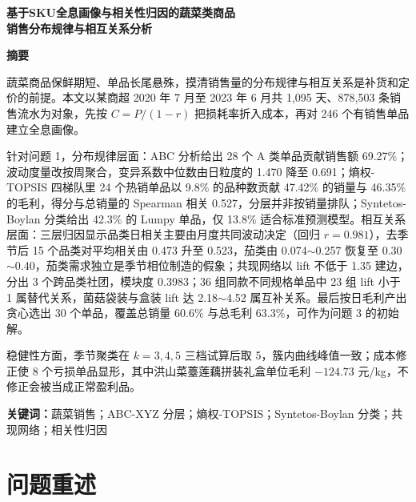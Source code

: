 \documentclass[zihao=-4,a4paper]{ctexart}
\begin{document}
\begin{center}
{\textbf{基于SKU全息画像与相关性归因的蔬菜类商品\\销售分布规律与相互关系分析}}
\end{center}

\vspace{0.8em}
\begin{center}\textbf{摘\quad 要}\end{center}

蔬菜商品保鲜期短、单品长尾悬殊，摸清销售量的分布规律与相互关系是补货和定价的前提。本文以某商超 2020 年 7 月至 2023 年 6 月共 1,095 天、878,503 条销售流水为对象，先按 $C=P/(1-r)$ 把损耗率折入成本，再对 246 个有销售单品建立全息画像。

针对问题 1，分布规律层面：ABC 分析给出 28 个 A 类单品贡献销售额 69.27\%；波动度量改按周聚合，变异系数中位数由日粒度的 1.470 降至 0.691；熵权-TOPSIS 四梯队里 24 个热销单品以 9.8\% 的品种数贡献 47.42\% 的销量与 46.35\% 的毛利，得分与总销量的 Spearman 相关 0.527，分层并非按销量排队；Syntetos-Boylan 分类给出 42.3\% 的 Lumpy 单品，仅 13.8\% 适合标准预测模型。相互关系层面：三层归因显示品类日相关主要由月度共同波动决定（回归 $r=0.981$），去季节后 15 个品类对平均相关由 0.473 升至 0.523，茄类由 0.074$\sim$0.257 恢复至 0.30$\sim$0.40，茄类需求独立是季节相位制造的假象；共现网络以 lift 不低于 1.35 建边，分出 3 个跨品类社团，模块度 0.3983；36 组同款不同规格单品中 23 组 lift 小于 1 属替代关系，菌菇袋装与盒装 lift 达 2.18$\sim$4.52 属互补关系。最后按日毛利产出贪心选出 30 个单品，覆盖总销量 60.6\% 与总毛利 63.3\%，可作为问题 3 的初始解。


稳健性方面，季节聚类在 $k=3,4,5$ 三档试算后取 5，簇内曲线峰值一致；成本修正使 8 个亏损单品显形，其中洪山菜薹莲藕拼装礼盒单位毛利 $-124.73$ 元/kg，不修正会被当成正常盈利品。

\vspace{0.6em}
\noindent\textbf{关键词：}\quad 蔬菜销售；ABC-XYZ 分层；熵权-TOPSIS；Syntetos-Boylan 分类；共现网络；相关性归因

\newpage

\section{问题重述}
\end{document}
